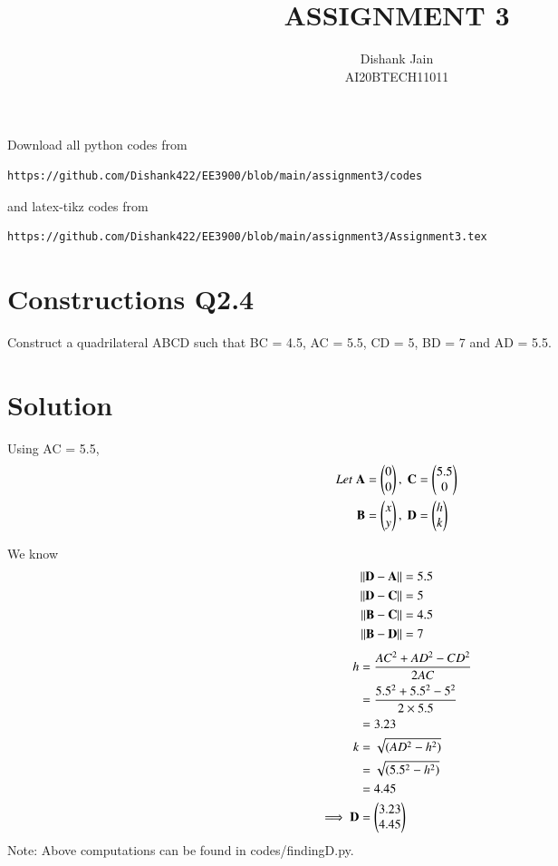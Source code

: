 \documentclass[journal,12pt,twocolumn]{IEEEtran}
\begin{document}
     \def\centbox#1{\makebox[0in]{#1}}
     \def\topbox#1{\raisebox{-\baselineskip}[0in][0in]{#1}}
     \def\midbox#1{\raisebox{-0.5\baselineskip}[0in][0in]{#1}}
\vspace{3cm}
\title{ASSIGNMENT 3}
\author{Dishank Jain \\ AI20BTECH11011}
\maketitle
\newpage
\bigskip
\renewcommand{\thefigure}{\theenumi}
\renewcommand{\thetable}{\theenumi}
Download all python codes from 
\begin{lstlisting}
https://github.com/Dishank422/EE3900/blob/main/assignment3/codes
\end{lstlisting}
%
and latex-tikz codes from 
%
\begin{lstlisting}
https://github.com/Dishank422/EE3900/blob/main/assignment3/Assignment3.tex
\end{lstlisting}
%
\section{Constructions Q2.4}
Construct a quadrilateral ABCD such that BC = 4.5, AC = 5.5, CD = 5, BD = 7  and AD = 5.5.
\section{Solution}
Using AC = 5.5,
\begin{align}
    Let\; \mathbf{A} &= \begin{pmatrix}0\\0\end{pmatrix},\; \mathbf{C} = \begin{pmatrix}5.5\\0\end{pmatrix}\\
    \mathbf{B} &= \begin{pmatrix}x\\y\end{pmatrix},\; \mathbf{D} = \begin{pmatrix}h\\k\end{pmatrix}
\end{align}

We know 
\begin{align}
    \lVert\mathbf{D}-\mathbf{A}\rVert &= 5.5\label{DA}\\
    \lVert\mathbf{D}-\mathbf{C}\rVert &= 5\label{DC}\\
    \lVert\mathbf{B}-\mathbf{C}\rVert &= 4.5\label{BC}\\
    \lVert\mathbf{B}-\mathbf{D}\rVert &= 7\label{BD}
\end{align}
\begin{align}
    h &= \dfrac{AC^2+AD^2-CD^2}{2AC}\\
      &= \dfrac{5.5^2+5.5^2-5^2}{2\times 5.5}\\
      &= 3.23\\
    k &= \sqrt{(AD^2-h^2)}\\
      &= \sqrt{(5.5^2-h^2)}\\
      &= 4.45\\
    \implies \mathbf{D} &= \begin{pmatrix}3.23\\4.45\end{pmatrix}
\end{align}
Note: Above computations can be found in codes/finding\textunderscore D.py.
\end{document}
